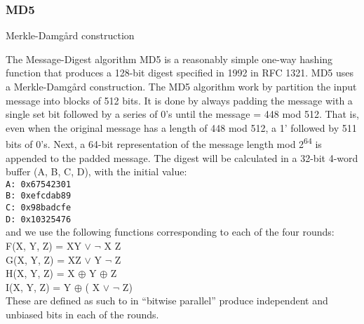 \documentclass[a4paper]{article}
\begin{document}
\subsubsection{MD5}
\label{sec:org24a54d2}
Merkle-Damgård construction


The Message-Digest algorithm MD5 is a reasonably simple one-way hashing function that produces a 128-bit digest specified in 1992 in RFC 1321\cite{}. MD5 uses a Merkle-Damgård construction.
The MD5 algorithm work by partition the input message into blocks of 512 bits. It is done by always padding the message with a single set bit followed by a series of 0's until the message = 448 mod 512. That is, even when the original message has a length of 448 mod 512, a 1' followed by 511 bits of 0's.
Next, a 64-bit representation of the message length mod 2\textsuperscript{64} is appended to the padded message.
The digest will be calculated in a 32-bit 4-word buffer (A, B, C, D), with the initial value:\\
\texttt{A: 0x67542301}\\
\texttt{B: 0xefcdab89}\\
\texttt{C: 0x98badcfe}\\
\texttt{D: 0x10325476}\\
and we use the following functions corresponding to each of the four rounds:\\
F(X, Y, Z) = XY \(\vee\) \(\neg{}\) X Z\\
G(X, Y, Z) = XZ \(\vee\) Y \(\neg{}\) Z\\
H(X, Y, Z) = X \(\oplus\) Y \(\oplus\) Z\\
I(X, Y, Z) = Y \(\oplus\) ( X \(\vee\) \(\neg{}\) Z)\\
These are defined as such to in ``bitwise parallel'' produce independent and unbiased bits in each of the rounds.
\end{document}
